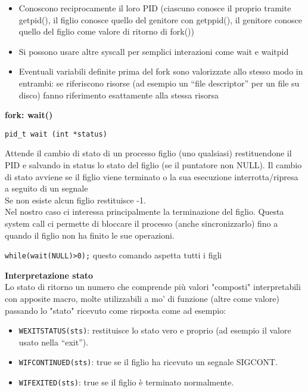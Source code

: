 \begin{flushleft}
\begin{flushleft}
    \begin{itemize}
      \item Conoscono reciprocamente il loro PID (ciascuno conosce il proprio tramite 
            getpid(), il figlio conosce quello del genitore con getppid(), il genitore 
            conosce quello del figlio come valore di ritorno di fork())
      \item Si possono usare altre syscall per semplici interazioni come wait e waitpid
      \item Eventuali variabili definite prima del fork sono valorizzate allo stesso modo in 
            entrambi: se riferiscono risorse (ad esempio un “file descriptor” per un file su 
            disco) fanno riferimento esattamente alla stessa risorsa
    \end{itemize}
    \textbf{fork: wait()} \par 
    \texttt{pid\_t wait (int *status)} \\
    \begin{flushleft}
      Attende il cambio di stato di un processo figlio (uno qualsiasi) restituendone il PID e salvando 
      in status lo stato del figlio (se il puntatore non \ace NULL). Il cambio di stato avviene se il figlio 
      viene terminato o la sua esecuzione interrotta/ripresa a seguito di un segnale \\
      Se non esiste alcun figlio restituisce -1. \\
      Nel nostro caso ci interessa principalmente la terminazione del figlio. Questa system call ci 
      permette di bloccare il processo (anche sincronizzarlo) fino a quando il figlio non ha finito le sue 
      operazioni. \par
      \texttt{while(wait(NULL)>0);} questo comando aspetta tutti i figli \par 
      \textbf{Interpretazione stato}\\
      Lo stato di ritorno \ace un numero che comprende più valori "composti" interpretabili con apposite 
      macro, molte utilizzabili a mo' di funzione (altre come valore) passando lo "stato" ricevuto come 
      risposta come ad esempio:
      \begin{itemize}
        \item \texttt{WEXITSTATUS(sts)}: restituisce lo stato vero e proprio (ad esempio il valore usato nella “exit”).
        \item \texttt{WIFCONTINUED(sts)}: true se il figlio ha ricevuto un segnale SIGCONT.
        \item \texttt{WIFEXITED(sts)}: true se il figlio è terminato normalmente.

\end{itemize}
\end{flushleft}
\end{flushleft}
\end{flushleft}
